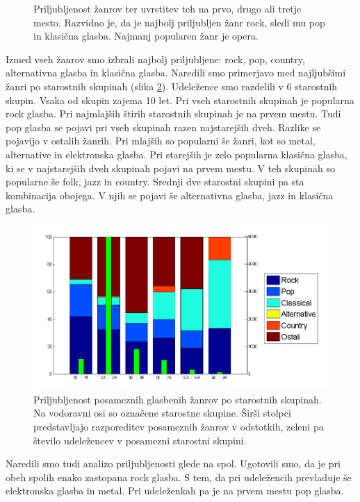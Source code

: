 \documentclass[a4paper, 12pt]{book}
\begin{document}
{\begin{figure}[hbt]
\caption{Priljubljenost žanrov ter uvrstitev teh na prvo, drugo ali tretje mesto. Razvidno je, da je najbolj priljubljen žanr rock, sledi mu pop in klasična glasba. Najmanj popularen žanr je opera.}
\label{zanrigraf}
\end{figure}

Izmed vseh žanrov smo izbrali najbolj priljubljene: rock, pop, country, alternativna glasba in klasična glasba. Naredili smo primerjavo med najljubšimi žanri po starostnih skupinah (slika \ref{zanrigraftop}). Udeležence smo razdelili v 6 starostnih skupin. Vsaka od skupin zajema 10 let. Pri vseh starostnih skupinah je popularna rock glasba. Pri najmlajših štirih starostnih skupinah je na prvem mestu. Tudi pop glasba se pojavi pri vseh skupinah razen najstarejših dveh. Razlike se pojavijo v ostalih žanrih. Pri mlajših so popularni še žanri, kot so metal, alternative in elektronska glasba. Pri starejših je zelo popularna klasična glasba, ki se v najstarejših dveh skupinah pojavi na prvem mestu. V teh skupinah so popularne še folk, jazz in country. Srednji dve starostni skupini pa sta kombinacija obojega. V njih se pojavi še alternativna glasba, jazz in klasična glasba. 

\begin{figure}[hbt]
\centering
\includegraphics[width=14cm]{images/genre123.png}

\caption{Priljubljenost posameznih glasbenih žanrov po starostnih skupinah. Na vodoravni osi so označene starostne skupine. Širši stolpci predstavljajo razporeditev posameznih žanrov v odstotkih, zeleni pa število udeležencev v posamezni starostni skupini.  }
\label{zanrigraftop}
\end{figure}

Naredili smo tudi analizo priljubljenosti glede na spol. Ugotovili smo, da je pri obeh spolih enako zastopana rock glasba. S tem, da pri udeležencih prevladuje še elektronska glasba in metal. Pri udeleženkah pa je na prvem mestu pop glasba. 


}
\end{document}
